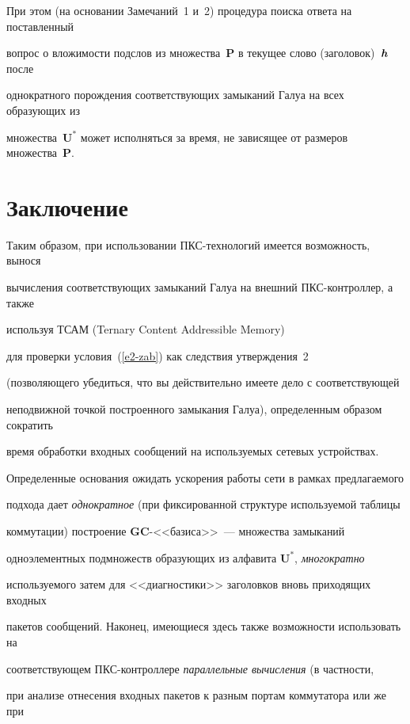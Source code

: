 При этом (на основании Замечаний~1 и~2) процедура поиска ответа на по\-став\-лен\-ный 

вопрос о вложимости подслов из множества~$\mathbf{P}$ в текущее слово (заголовок)~$\mbox{{\boldmath${h}$}}$ после 

однократного порождения соответствующих замыканий Галуа на всех образующих из 

множества~$\mathbf{U}^*$ может исполняться за время, не зависящее от размеров множества~$\mathbf{P}$.





\section{Заключение}



     Таким образом, при использовании ПКС-технологий имеется возможность, вынося 

вычисления соответствующих замыканий Галуа на внешний ПКС-конт\-рол\-лер, а также 

используя ТСАМ (Ternary Content Addressible Memory)

для проверки условия~(\ref{e2-zab}) как следствия утверждения~2 

(позволяющего убедиться, что вы действительно имеете дело с соответствующей 

неподвижной точкой построенного замыкания Галуа), определенным образом сократить 

время обработки входных сообщений на используемых сетевых устройствах. 

Определенные основания ожидать ускорения работы сети в рамках предлагаемого 

подхода дает \textit{однократное} (при фиксированной структуре используемой таблицы 

коммутации) построение \textbf{GC}-<<ба\-зи\-са>>~--- множества замыканий 

одноэлементных подмножеств образующих из алфавита $\mathbf{U}^*$, \textit{многократно} 

используемого затем для <<диагностики>> заголовков вновь приходящих входных 

пакетов сообщений. Наконец, имеющиеся здесь также возможности использовать на 

соответствующем ПКС-конт\-рол\-ле\-ре \textit{параллельные вычисления} (в частности, 

при анализе отнесения входных пакетов к разным портам коммутатора или же при 

